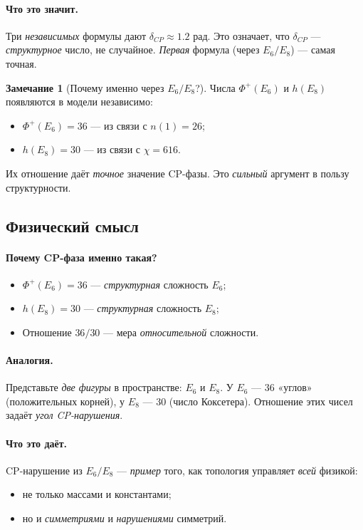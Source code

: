 \documentclass[11pt,a4paper]{article}
\theoremstyle{definition}
\newtheorem{remark}[theorem]{Замечание}
\begin{document}
\paragraph{Что это значит.}
Три \emph{независимых} формулы дают $\delta_{CP} \approx 1.2$ рад. 
Это означает, что $\delta_{CP}$ — \emph{структурное} число, 
не случайное. \emph{Первая} формула (через $E_6/E_8$) — 
самая точная.

\begin{remark}[Почему именно через $E_6/E_8$?]
\label{rem:why-e6-e8}
Числа $\Phi^+(E_6)$ и $h(E_8)$ появляются в модели независимо:
\begin{itemize}
    \item $\Phi^+(E_6) = 36$ — из связи с $n(1) = 26$;
    \item $h(E_8) = 30$ — из связи с $\chi = 616$.
\end{itemize}
Их отношение даёт \emph{точное} значение CP-фазы. 
Это \emph{сильный} аргумент в пользу структурности.
\end{remark}

\subsection{Физический смысл}
\label{subsec:cp-meaning}

\paragraph{Почему CP-фаза именно такая?}
\begin{itemize}
    \item $\Phi^+(E_6) = 36$ — \emph{структурная} сложность $E_6$;
    \item $h(E_8) = 30$ — \emph{структурная} сложность $E_8$;
    \item Отношение $36/30$ — мера \emph{относительной} сложности.
\end{itemize}

\paragraph{Аналогия.}
Представьте \emph{две фигуры} в пространстве: $E_6$ и $E_8$. 
У $E_6$ — $36$ «углов» (положительных корней), у $E_8$ — $30$ 
(число Коксетера). Отношение этих чисел задаёт 
\emph{угол CP-нарушения}.

\paragraph{Что это даёт.}
CP-нарушение из $E_6/E_8$ — \emph{пример} того, как топология 
управляет \emph{всей} физикой:
\begin{itemize}
    \item не только массами и константами;
    \item но и \emph{симметриями} и \emph{нарушениями} симметрий.
\end{itemize}
\end{document}

